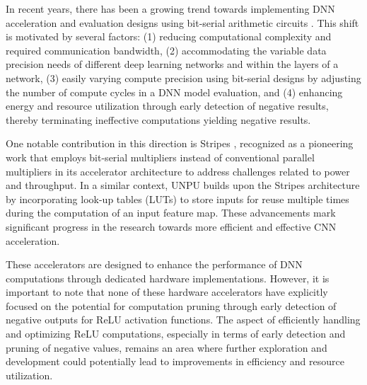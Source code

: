 \documentclass[conference]{IEEEtran}
\begin{document}
In recent years, there has been a growing trend towards implementing DNN acceleration and evaluation designs using bit-serial arithmetic circuits \cite{judd2016stripes, lee2018unpu, hsu2020essa, isobe2020low, li2022bitcluster}. This shift is motivated by several factors: (1) reducing computational complexity and required communication bandwidth, (2) accommodating the variable data precision needs of different deep learning networks and within the layers of a network, (3) easily varying compute precision using bit-serial designs by adjusting the number of compute cycles in a DNN model evaluation, and (4) enhancing energy and resource utilization through early detection of negative results, thereby terminating ineffective computations yielding negative results.

One notable contribution in this direction is Stripes \cite{judd2016stripes}, recognized as a pioneering work that employs bit-serial multipliers instead of conventional parallel multipliers in its accelerator architecture to address challenges related to power and throughput. In a similar context, UNPU \cite{lee2018unpu} builds upon the Stripes architecture by incorporating look-up tables (LUTs) to store inputs for reuse multiple times during the computation of an input feature map. These advancements mark significant progress in the research towards more efficient and effective CNN acceleration.

These accelerators are designed to enhance the performance of DNN computations through dedicated hardware implementations. However, it is important to note that none of these hardware accelerators have explicitly focused on the potential for computation pruning through early detection of negative outputs for ReLU activation functions. The aspect of efficiently handling and optimizing ReLU computations, especially in terms of early detection and pruning of negative values, remains an area where further exploration and development could potentially lead to improvements in efficiency and resource utilization. 
\end{document}

